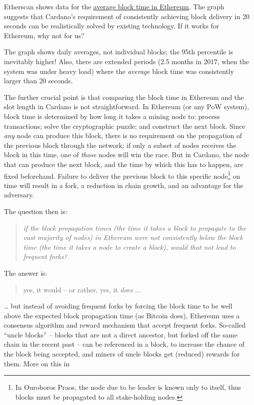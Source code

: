 \documentclass[]{article}
\begin{document}
Etherscan shows data for the
\href{https://etherscan.io/chart/blocktime}{{average block time in
Ethereum}}. The graph suggests that Cardano's requirement of
consistently achieving block delivery in 20 seconds can be realistically
solved by existing technology. If it works for Ethereum, why not for us?

The graph shows daily averages, not individual blocks; the 95th
percentile is inevitably higher! Also, there are extended periods (2.5
months in 2017, when the system was under heavy load) where the
\emph{average} block time was consistently larger than 20 seconds.

The further crucial point is that comparing the block time in Ethereum
and the slot length in Cardano is not straightforward. In Ethereum (or
any PoW system), block time is determined by how long it takes a mining
node to: process transactions; solve the cryptographic puzzle; and
construct the next block. Since \emph{any} node can produce this block,
there is no requirement on the propagation of the previous block through
the network; if only a subset of nodes receives the block in this time,
one of \emph{those} nodes will win the race. But in Cardano, the node
that can produce the next block, and the time by which this has to
happen, are fixed beforehand. Failure to deliver the previous block to
this specific node\footnote{In Ouroboros Praos, the node due to be
  leader is known only to itself, thus blocks must be propagated to all
  stake-holding nodes.} on time will result in a fork, a reduction in
chain growth, and an advantage for the adversary.

The question then is:

\begin{quote}
\emph{if the block propagation times (the time it takes a block to
propagate to the vast majority of nodes) in Ethereum were not
consistently below the block time (the time it takes a node to create a
block), would that not lead to frequent forks?}
\end{quote}

The answer is:

\begin{quote}
yes, it would -- or rather, yes, it \emph{does} ...
\end{quote}

\ldots{} but instead of avoiding frequent forks by forcing the block
time to be well above the expected block propagation time (as Bitcoin
does), Ethereum uses a consensus algorithm and reward mechanism that
accept frequent forks. So-called ``uncle blocks'' -- blocks that are not
a direct ancestor, but forked off the same chain in the recent past --
can be referenced in a block, to increase the chance of the block being
accepted, and miners of uncle blocks get (reduced) rewards for them.
More on this in
\end{document}
